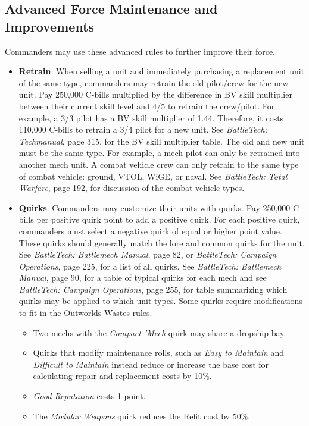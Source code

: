\documentclass[UTF8]{article}
\begin{document}
\newpage

\subsection{Advanced Force Maintenance and Improvements}

Commanders may use these advanced rules to further improve their force.

\begin{itemize}

\item {\bf Retrain}: When selling a unit and immediately purchasing a replacement unit of the same type, commanders may retrain the old pilot/crew for the new unit.
Pay 250,000 C-bills multiplied by the difference in BV skill multiplier between their current skill level and 4/5 to retrain the crew/pilot.
For example, a 3/3 pilot has a BV skill multiplier of 1.44.
Therefore, it costs 110,000 C-bills to retrain a 3/4 pilot for a new unit.
See \emph{BattleTech: Techmanual}, page 315, for the BV skill multiplier table.
The old and new unit must be the same type.
For example, a mech pilot can only be retrained into another mech unit.
A combat vehicle crew can only retrain to the same type of combat vehicle: ground, VTOL, WiGE, or naval.
See \emph{BattleTech: Total Warfare}, page 192, for discussion of the combat vehicle types.

\item {\bf Quirks}: Commanders may customize their units with quirks.
Pay 250,000 C-bills per positive quirk point to add a positive quirk.
For each positive quirk, commanders must select a negative quirk of equal or higher point value.
These quirks should generally match the lore and common quirks for the unit.
See \emph{BattleTech: Battlemech Manual}, page 82, or \emph{BattleTech: Campaign Operations}, page 225, for a list of all quirks.
See \emph{BattleTech: Battlemech Manual}, page 90, for a table of typical quirks for each mech and see \emph{BattleTech: Campaign Operations}, page 255, for table summarizing which quirks may be applied to which unit types.
Some quirks require modifications to fit in the Outworlds Wastes rules.

\begin{itemize}

\item Two mechs with the \emph{Compact 'Mech} quirk may share a dropship bay.

\item Quirks that modify maintenance rolls, such as \emph{Easy to Maintain} and \emph{Difficult to Maintain} instead reduce or increase the base cost for calculating repair and replacement costs by 10\%.

\item \emph{Good Reputation} costs 1 point.

\item The \emph{Modular Weapons} quirk reduces the Refit cost by 50\%.

\end{itemize}

\end{itemize}
\end{document}
